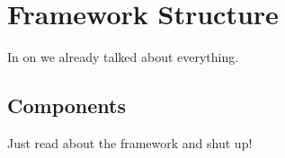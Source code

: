 \documentclass[../main.tex]{subfiles}
\begin{document}
\section{Framework Structure}\label{sec:FrameworkStructure}
In  on  we already talked about everything.

\subsection{Components}
Just read  about the framework and shut up!
\end{document}
